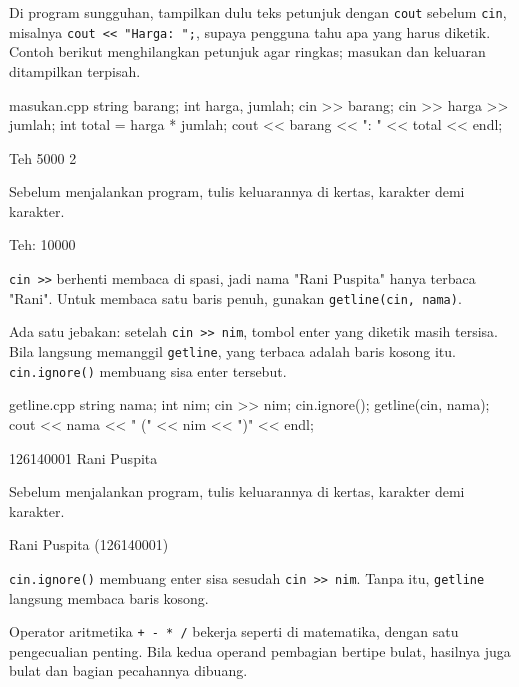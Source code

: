 \documentclass[a4paper]{article}
\begin{document}
Di program sungguhan, tampilkan dulu teks petunjuk dengan \texttt{cout} sebelum \texttt{cin}, misalnya \texttt{cout << "Harga: ";}, supaya pengguna tahu apa yang harus diketik. Contoh berikut menghilangkan petunjuk agar ringkas; masukan dan keluaran ditampilkan terpisah.

\begin{MKode}{masukan.cpp}
string barang;
int harga, jumlah;
cin >> barang;
cin >> harga >> jumlah;
int total = harga * jumlah;
cout << barang << ": " << total << endl;
\end{MKode}
\begin{MKeluaran}[title={Masukan}]
Teh
5000 2
\end{MKeluaran}
\begin{Tebak}[]
Sebelum menjalankan program, tulis keluarannya di kertas, karakter demi karakter.
\end{Tebak}
\begin{Jawaban}[]
\begin{MKeluaran}[]
Teh: 10000
\end{MKeluaran}

\end{Jawaban}
\texttt{cin >>} berhenti membaca di spasi, jadi nama "Rani Puspita" hanya terbaca "Rani". Untuk membaca satu baris penuh, gunakan \texttt{getline(cin, nama)}.

Ada satu jebakan: setelah \texttt{cin >> nim}, tombol enter yang diketik masih tersisa. Bila langsung memanggil \texttt{getline}, yang terbaca adalah baris kosong itu. \texttt{cin.ignore()} membuang sisa enter tersebut.

\begin{MKode}{getline.cpp}
string nama;
int nim;
cin >> nim;
cin.ignore();
getline(cin, nama);
cout << nama << " (" << nim << ")" << endl;
\end{MKode}
\begin{MKeluaran}[title={Masukan}]
126140001
Rani Puspita
\end{MKeluaran}
\begin{Tebak}[]
Sebelum menjalankan program, tulis keluarannya di kertas, karakter demi karakter.
\end{Tebak}
\begin{Jawaban}[]
\begin{MKeluaran}[]
Rani Puspita (126140001)
\end{MKeluaran}
\texttt{cin.ignore()} membuang enter sisa sesudah \texttt{cin >> nim}. Tanpa itu, \texttt{getline} langsung membaca baris kosong.
\end{Jawaban}
Operator aritmetika \texttt{+ - * /} bekerja seperti di matematika, dengan satu pengecualian penting. Bila kedua operand pembagian bertipe bulat, hasilnya juga bulat dan bagian pecahannya dibuang.
\end{document}
